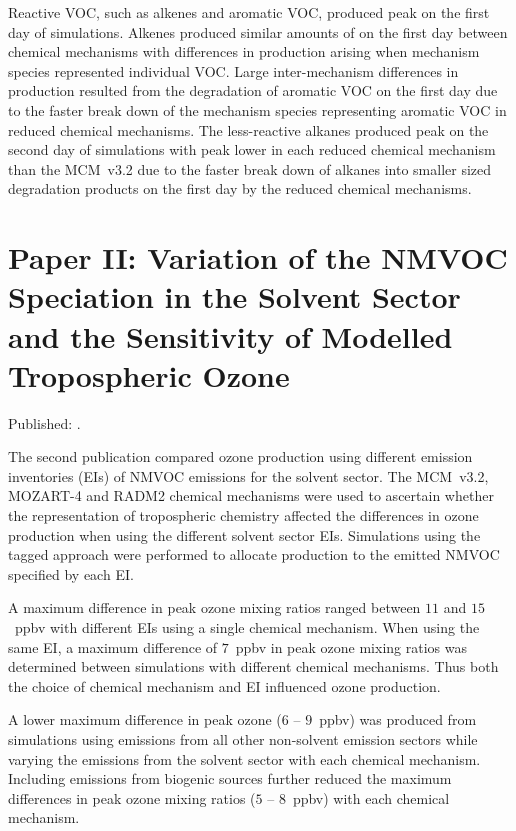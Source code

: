 Reactive VOC, such as alkenes and aromatic VOC, produced peak  on the first day of simulations.
Alkenes produced similar amounts of  on the first day between chemical mechanisms with differences in  production arising when mechanism species represented individual VOC.
Large inter-mechanism differences in  production resulted from the degradation of aromatic VOC on the first day due to the faster break down of the mechanism species representing aromatic VOC in reduced chemical mechanisms.
The less-reactive alkanes produced peak  on the second day of simulations with peak  lower in each reduced chemical mechanism than the MCM~v3.2 due to the faster break down of alkanes into smaller sized degradation products on the first day by the reduced chemical mechanisms.

\singlespacing
\section{Paper II: Variation of the NMVOC Speciation in the Solvent Sector and the Sensitivity of Modelled Tropospheric Ozone} \label{s:EI_results}

\onehalfspacing

\noindent
Published: .

The second publication compared ozone production using different emission inventories (EIs) of NMVOC emissions for the solvent sector.
The MCM~v3.2, MOZART-4 and RADM2 chemical mechanisms were used to ascertain whether the representation of tropospheric chemistry affected the differences in ozone production when using the different solvent sector EIs.
Simulations using the tagged approach were performed to allocate  production to the emitted NMVOC specified by each EI.

A maximum difference in peak ozone mixing ratios ranged between $11$ and $15$~ppbv with different EIs using a single chemical mechanism.
When using the same EI, a maximum difference of $7$~ppbv in peak ozone mixing ratios was determined between simulations with different chemical mechanisms.
Thus both the choice of chemical mechanism and EI influenced ozone production.

A lower maximum difference in peak ozone ($6$ -- $9$~ppbv) was produced from simulations using emissions from all other non-solvent emission sectors while varying the emissions from the solvent sector with each chemical mechanism.
Including emissions from biogenic sources further reduced the maximum differences in peak ozone mixing ratios ($5$ -- $8$~ppbv) with each chemical mechanism.

